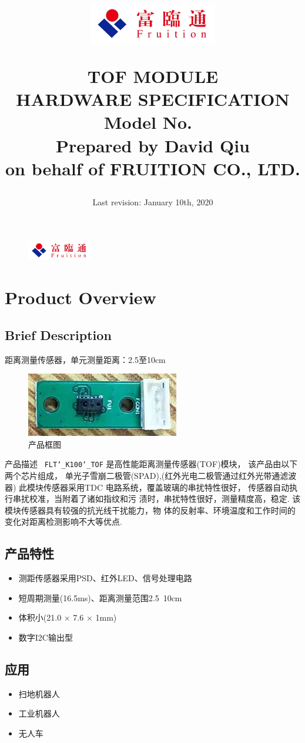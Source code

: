 \documentclass{scrreprt}
\title{
	\begin{figure}[H]
		\centering\includegraphics[width=0.5\textwidth]{logo.jpeg}
	\end{figure}
	\vspace{1cm}
	\flushright
	\Huge{TOF MODULE}\\
	\Huge{HARDWARE SPECIFICATION}\\
	\vspace{2cm}
	\huge{Model No.\ \modelno}\\
	\vspace{2cm}
	\LARGE{Prepared by David Qiu \\ on behalf of FRUITION CO., LTD.}
}
\date{
	Last revision: January 10th, 2020\\
}
\newcommand{\pchapter}[1]{
	\begingroup\let\clearpage\relax
	\newpage
	\begin{figure}[H]
		\includegraphics[width=0.25\textwidth]{logo.jpeg}
	\end{figure}
	\chapter{#1}
	\endgroup
}
\newcommand{\modelno}{
	\texttt{FLT\char`_K100\char`_TOF}
}
\newcommand{\x}{
	$\times$
}
\begin{document}
\begin{CJK*}{UTF8}{gbsn}
\maketitle
\tableofcontents

\pchapter{Product Overview}
\section{Brief Description}
距离测量传感器，单元测量距离：2.5至10cm

\begin{figure}[H]
\center\includegraphics{tof-picture.png}
\caption{产品框图}
\end{figure}

产品描述\ \modelno 是高性能距离测量传感器(TOF)模块， 该产品由以下两个芯片组成，
单光子雪崩二极管(SPAD),(红外光电二极管通过红外光带通滤波器) 此模块传感器采用TDC
电路系统，覆盖玻璃的串扰特性很好， 传感器自动执行串扰校准，当附着了诸如指纹和污
渍时，串扰特性很好，测量精度高，稳定.  该模块传感器具有较强的抗光线干扰能力，物
体的反射率、环境温度和工作时间的变化对距离检测影响不大等优点.

\section{产品特性}
\begin{itemize}
	\item 测距传感器采用PSD、红外LED、信号处理电路
	\item 短周期测量(16.5ms)、距离测量范围2.5~10cm
	\item 体积小(21.0\x7.6\x1mm)
	\item 数字I2C输出型
\end{itemize}

\section{应用}
\begin{itemize}
	\item 扫地机器人
	\item 工业机器人
	\item 无人车
\end{itemize}


\end{CJK*}
\end{document}
